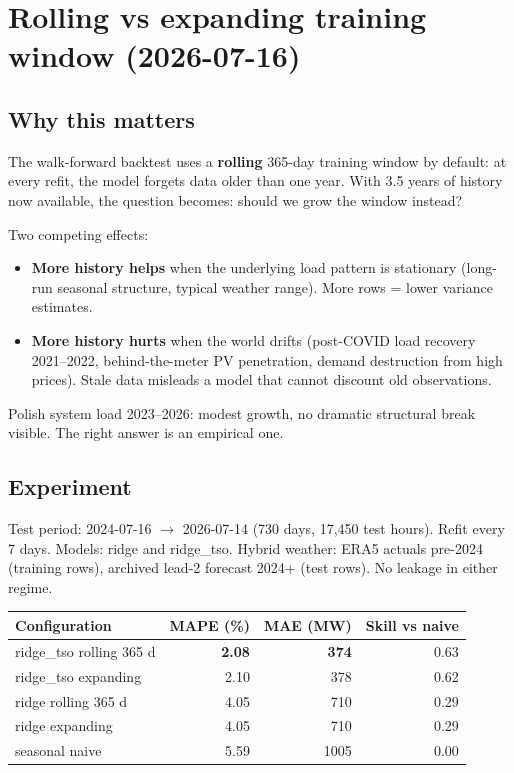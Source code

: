\section{Rolling vs expanding training window (2026-07-16)}

\subsection{Why this matters}

The walk-forward backtest uses a \textbf{rolling} 365-day training window
by default: at every refit, the model forgets data older than one year.
With 3.5 years of history now available, the question becomes: should we
grow the window instead?

Two competing effects:

\begin{itemize}
  \item \textbf{More history helps} when the underlying load pattern is
        stationary (long-run seasonal structure, typical weather range).
        More rows = lower variance estimates.
  \item \textbf{More history hurts} when the world drifts (post-COVID
        load recovery 2021--2022, behind-the-meter PV penetration, demand
        destruction from high prices). Stale data misleads a model that
        cannot discount old observations.
\end{itemize}

Polish system load 2023--2026: modest growth, no dramatic structural break
visible. The right answer is an empirical one.

\subsection{Experiment}

Test period: 2024-07-16 $\to$ 2026-07-14 (730 days, 17{,}450 test hours).
Refit every 7 days. Models: ridge and ridge\_tso.
Hybrid weather: ERA5 actuals pre-2024 (training rows), archived lead-2
forecast 2024+ (test rows). No leakage in either regime.

\begin{center}
\begin{tabular}{lrrr}
\toprule
Configuration & MAPE (\%) & MAE (MW) & Skill vs naive \\
\midrule
ridge\_tso rolling 365 d  & \textbf{2.08} & \textbf{374} & 0.63 \\
ridge\_tso expanding      & 2.10 & 378 & 0.62 \\
ridge rolling 365 d       & 4.05 & 710 & 0.29 \\
ridge expanding           & 4.05 & 710 & 0.29 \\
seasonal naive            & 5.59 & 1005 & 0.00 \\
\bottomrule
\end{tabular}
\end{center}

